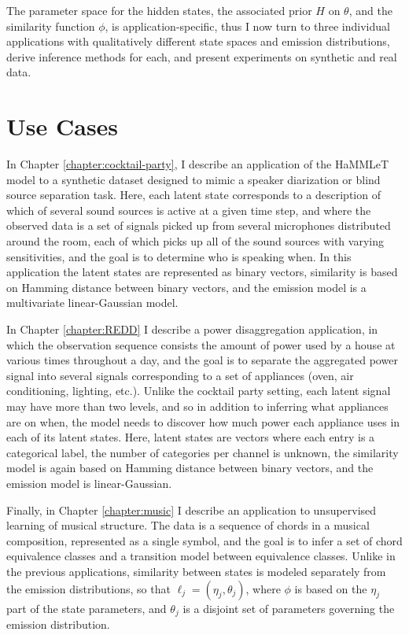 The parameter space for the hidden states, 
the associated prior $H$ on $\theta$, and the similarity function
$\phi$, is application-specific, thus I now turn to three individual
applications with qualitatively different state spaces and emission distributions,
derive inference methods for each, and present experiments on
synthetic and real data.

\section{Use Cases}

In Chapter \ref{chapter:cocktail-party}, I describe an application of the
HaMMLeT model to a synthetic dataset designed to mimic a 
speaker diarization or blind source separation task. Here, each latent
state corresponds to a description of which of several sound sources
is active at a given time step, and where the observed data is a set
of signals picked up from several microphones distributed around the
room, each of which picks up all of the sound sources with varying
sensitivities, and the goal is to determine who is speaking when.  In
this application the latent states are represented as binary vectors,
similarity is based on Hamming distance between binary vectors, and
the emission model is a multivariate linear-Gaussian model.

In Chapter \ref{chapter:REDD} I describe a power disaggregation
application, in which the observation sequence consists the amount of power used
by a house at various times throughout a day, and the goal is to
separate the aggregated power signal into several signals
corresponding to a set of appliances (oven, air conditioning,
lighting, etc.).  Unlike the cocktail party setting, each latent
signal may have more than two levels, and so in addition to inferring
what appliances are on when, the model needs to discover how much
power each appliance uses in each of its latent states.  Here, latent
states are vectors where each entry is a categorical label, the number
of categories per channel is unknown, the similarity model is again
based on Hamming distance between binary vectors, and the emission 
model is linear-Gaussian.

Finally, in Chapter \ref{chapter:music} I describe an application to
unsupervised learning of musical structure.  The data is a sequence of
chords in a musical composition, represented as a single symbol, and
the goal is to infer a set of chord equivalence classes and a
transition model between equivalence classes.  Unlike in the previous
applications, similarity between states is modeled separately from the
emission distributions, so that $\ell_j = (\eta_j, \theta_j)$, where
$\phi$ is based on the $\eta_j$ part of the state parameters, and
$\theta_j$ is a disjoint set of parameters governing the emission distribution.

